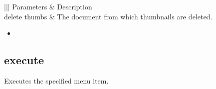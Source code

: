 \documentclass[letterpaper,12pt,english,openany,oneside]{sphinxmanual}
\begin{document}
\begin{savenotes}\sphinxattablestart
\centering
{}\label{\detokenize{IAC_API_AppleEvtObjects:section-33}}\nobreak
\begin{tabular}[t]{|||}
\hline
\sphinxstyletheadfamily 
Parameters
&\sphinxstyletheadfamily 
Description
\\
\hline
delete thumbs
&
The document from which thumbnails are deleted.
\\
\hline
\end{tabular}
\par
\sphinxattableend\end{savenotes}
\label{\detokenize{IAC_API_AppleEvtObjects:related-events-10}}
\begin{itemize}
\item {} 

\end{itemize}
\label{\detokenize{IAC_API_AppleEvtObjects:applescript-example-14}}

\begin{sphinxVerbatim}[commandchars=\\\{\}]
   
\end{sphinxVerbatim}
\label{\detokenize{IAC_API_AppleEvtObjects:apple-event-id-5}}

\begin{sphinxVerbatim}[commandchars=\\\{\}]
 
\end{sphinxVerbatim}




\subsection{execute}
\label{\detokenize{IAC_API_AppleEvtObjects:execute}}
Executes the specified menu item.

\label{\detokenize{IAC_API_AppleEvtObjects:syntax-18}}

\begin{sphinxVerbatim}[commandchars=\\\{\}]
 \PYG{p}{[}\PYG{p}{]}
\end{sphinxVerbatim}
\label{\detokenize{IAC_API_AppleEvtObjects:parameters-19}}
\end{document}
